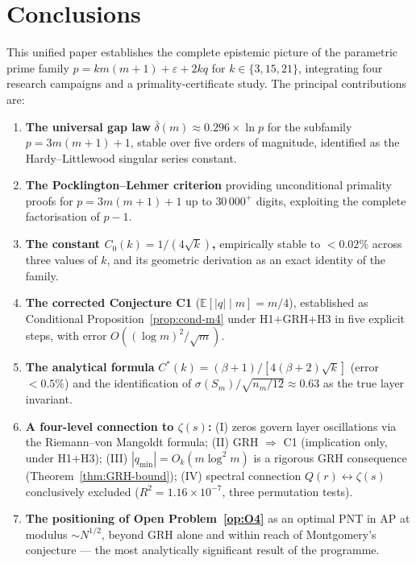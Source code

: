 \documentclass[11pt,a4paper]{article}
\theoremstyle{definition}
\theoremstyle{remark}
\newcommand{\E}{\mathbb{E}}
\newcommand{\qmin}{q_{\min}}
\newcommand{\eps}{\varepsilon}
\begin{document}
\section{Conclusions}\label{sec:conclusion}

This unified paper establishes the complete epistemic picture of the
parametric prime family $p=km(m+1)+\eps+2kq$ for $k\in\{3,15,21\}$,
integrating four research campaigns and a primality-certificate
study. The principal contributions are:

\begin{enumerate}
\item \textbf{The universal gap law} $\bar{\delta}(m)\approx
0.296\times\ln p$ for the subfamily $p=3m(m+1)+1$, stable over five
orders of magnitude, identified as the Hardy--Littlewood singular
series constant.
\item \textbf{The Pocklington--Lehmer criterion} providing
unconditional primality proofs for $p=3m(m+1)+1$ up to
$30\,000^{+}$ digits, exploiting the complete factorisation of
$p-1$.
\item \textbf{The constant $C_{0}(k)=1/(4\sqrt{k})$,} empirically
stable to $<0.02\%$ across three values of $k$, and its geometric
derivation as an exact identity of the family.
\item \textbf{The corrected Conjecture C1} ($\E[|q|\mid m]=m/4$),
established as Conditional Proposition~\ref{prop:cond-m4} under
H1$+$GRH$+$H3 in five explicit steps, with error
$O((\log m)^{2}/\sqrt{m})$.
\item \textbf{The analytical formula}
$C^{*}(k)=(\beta+1)/[4(\beta+2)\sqrt{k}]$ (error $<0.5\%$) and the
identification of $\sigma(S_{m})/\sqrt{n_{m}/12}\approx 0.63$ as
the true layer invariant.
\item \textbf{A four-level connection to $\zeta(s)$:}
(I) zeros govern layer oscillations via the Riemann--von Mangoldt
formula; (II) GRH $\Rightarrow$ C1 (implication only, under
H1$+$H3); (III) $|\qmin|=O_{k}(m\log^{2}m)$ is a rigorous GRH
consequence (Theorem~\ref{thm:GRH-bound}); (IV) spectral connection
$Q(r)\leftrightarrow\zeta(s)$ conclusively excluded
($R^{2}=1.16\times 10^{-7}$, three permutation tests).
\item \textbf{The positioning of Open Problem~\ref{op:O4}} as an
optimal PNT in AP at modulus $\sim N^{1/2}$, beyond GRH alone and
within reach of Montgomery's conjecture --- the most analytically
significant result of the programme.
\end{enumerate}
\end{document}
